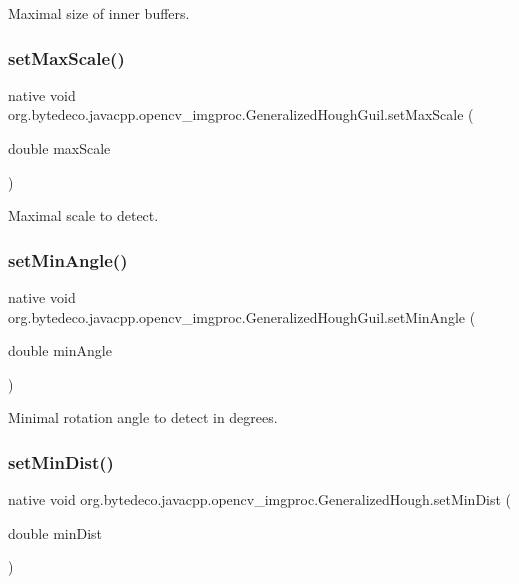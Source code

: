 Maximal size of inner buffers. \mbox{\label{group__imgproc_ga742c12ee154e98bd98c81edc1abada8c}} 
\subsubsection{\texorpdfstring{set\+Max\+Scale()}{setMaxScale()}}
{\footnotesize\ttfamily native void org.\+bytedeco.\+javacpp.\+opencv\+\_\+imgproc.\+Generalized\+Hough\+Guil.\+set\+Max\+Scale (\begin{DoxyParamCaption}\item[{double}]{max\+Scale }\end{DoxyParamCaption})}

Maximal scale to detect. \mbox{\label{group__imgproc_ga6d9072493fc3067f7d0cb91678f2d2ad}} 
\subsubsection{\texorpdfstring{set\+Min\+Angle()}{setMinAngle()}}
{\footnotesize\ttfamily native void org.\+bytedeco.\+javacpp.\+opencv\+\_\+imgproc.\+Generalized\+Hough\+Guil.\+set\+Min\+Angle (\begin{DoxyParamCaption}\item[{double}]{min\+Angle }\end{DoxyParamCaption})}

Minimal rotation angle to detect in degrees. \mbox{\label{group__imgproc_gaccebfd3efbb606d9af90fde480a93a79}} 
\subsubsection{\texorpdfstring{set\+Min\+Dist()}{setMinDist()}}
{\footnotesize\ttfamily native void org.\+bytedeco.\+javacpp.\+opencv\+\_\+imgproc.\+Generalized\+Hough.\+set\+Min\+Dist (\begin{DoxyParamCaption}\item[{double}]{min\+Dist }\end{DoxyParamCaption})}


